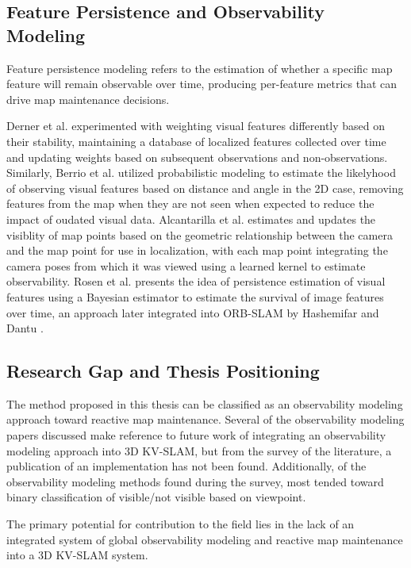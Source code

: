 \subsection{Feature Persistence and Observability Modeling}

Feature persistence modeling refers to the estimation of whether a specific map feature will remain observable over time, producing per-feature metrics that can drive map maintenance decisions.

Derner et al. \cite{dernerChangeDetectionUsing2021} experimented with weighting visual features differently based on their stability, maintaining a database of localized features collected over time and updating weights based on subsequent observations and non-observations. Similarly, Berrio et al. \cite{berrioUpdatingVisibilityFeaturebased2019,berrioLongtermMapMaintenance2020} utilized probabilistic modeling to estimate the likelyhood of observing visual features based on distance and angle in the 2D case, removing features from the map when they are not seen when expected to reduce the impact of oudated visual data. Alcantarilla et al. \cite{alcantarillaLearningVisibilityLandmarks2010} estimates and updates the visiblity of map points based on the geometric relationship between the camera and the map point for use in localization, with each map point integrating the camera poses from which it was viewed using a learned kernel to estimate observability. Rosen et al. \cite{rosenLifelongFeaturebasedMapping2016} presents the idea of persistence estimation of visual features using a Bayesian estimator to estimate the survival of image features over time, an approach later integrated into ORB-SLAM by Hashemifar and Dantu \cite{hashemifarPracticalPersistenceReasoning2020}.

\subsection{Research Gap and Thesis Positioning}

The method proposed in this thesis can be classified as an observability modeling approach toward reactive map maintenance. Several of the observability modeling papers discussed make reference to future work of integrating an observability modeling approach into 3D KV-SLAM, but from the survey of the literature, a publication of an implementation has not been found. Additionally, of the observability modeling methods found during the survey, most tended toward binary classification of visible/not visible based on viewpoint.

The primary potential for contribution to the field lies in the lack of an integrated system of global observability modeling and reactive map maintenance into a 3D KV-SLAM system.